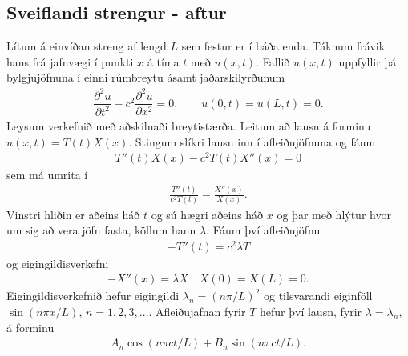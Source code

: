 \documentclass[a4paper,10pt,icelandic]{sphinxmanual}
\begin{document}
\subsection{Sveiflandi strengur - aftur}
\label{\detokenize{Kafli03:sveiflandi-strengur-aftur}}
Lítum á einvíðan streng af lengd \(L\) sem festur er í báða enda. Táknum frávik hans frá jafnvægi í punkti \(x\) á tíma \(t\) með \(u(x,t)\). Fallið \(u(x,t)\) uppfyllir þá bylgjujöfnuna í einni rúmbreytu ásamt jaðarskilyrðunum
\begin{equation*}
\begin{split}\dfrac{{\partial}^2u}{{\partial}t^2}-
 c^2\dfrac{{\partial}^2u}{{\partial}x^2}=0, \qquad u(0,t)=u(L,t)=0.\end{split}
\end{equation*}
Leysum verkefnið með aðskilnaði breytistærða. Leitum að lausn á forminu \(u(x,t) = T(t)X(x)\). Stingum slíkri lausn inn í afleiðujöfnuna og fáum
\begin{equation*}
\begin{split}T''(t) X(x) - c^2 T(t)X''(x) = 0\end{split}
\end{equation*}
sem má umrita í
\begin{equation*}
\begin{split}\frac{T''(t)}{c^2 T(t)} = \frac{X''(x)}{X(x)}.\end{split}
\end{equation*}
Vinstri hliðin er aðeins háð \(t\) og sú hægri aðeins háð \(x\) og þar með hlýtur hvor um sig að vera jöfn fasta, köllum hann \(\lambda\). Fáum því afleiðujöfnu
\begin{equation*}
\begin{split}-T''(t) = c^2 \lambda T\end{split}
\end{equation*}
og eigingildisverkefni
\begin{equation*}
\begin{split}-X''(x) = \lambda X \quad X(0) = X(L) = 0.\end{split}
\end{equation*}
Eigingildisverkefnið hefur eigingildi \(\lambda_n = (n\pi/L)^2\) og tilsvarandi eiginföll \(\sin(n\pi x/L)\), \(n=1,2,3,\ldots\). Afleiðujafnan fyrir \(T\) hefur því lausn, fyrir \(\lambda = \lambda_n\), á forminu
\begin{equation*}
\begin{split}A_n \cos(n\pi ct/L) + B_n \sin(n\pi c t/L).\end{split}
\end{equation*}
\end{document}
